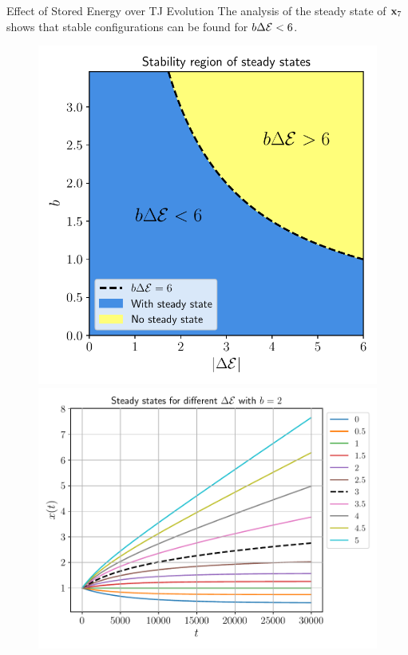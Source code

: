 \documentclass[usenames,dvipsnames]{beamer}
\begin{document}
\begin{frame}{Effect of Stored Energy over TJ Evolution}
The analysis of the steady state of {\color{red} $\x_7$} shows that stable configurations can be found for $b\Delta \mathcal{E} < 6$.
\begin{figure}
\includegraphics[scale=0.38,valign=t, trim={0 0 0 1em}]{figures/stored_energy/SE_stability.pdf}\hfill
\includegraphics[trim={1em 1em 1em 1em}, clip=true,scale=0.38,valign=t]{figures/stored_energy/SE_experiments.pdf}
\end{figure}
\end{frame}
\end{document}
